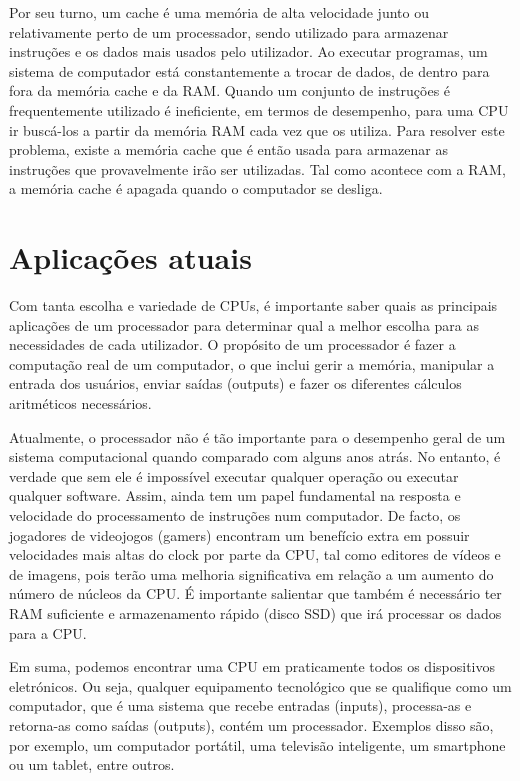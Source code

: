 \documentclass{report}
\begin{document}
Por seu turno, um cache é uma memória de alta velocidade junto ou relativamente perto de um processador, sendo utilizado para armazenar instruções e os dados mais usados pelo utilizador. Ao executar programas, um sistema de computador está constantemente a trocar de dados, de dentro para fora da memória cache e da \ac{RAM}. Quando um conjunto de instruções é frequentemente utilizado é ineficiente, em termos de desempenho, para uma \ac{CPU} ir buscá-los a partir da memória \ac{RAM} cada vez que os utiliza. Para resolver este problema, existe a memória cache que é então usada para armazenar as instruções que provavelmente irão ser utilizadas. Tal como acontece com a \ac{RAM}, a memória cache é apagada quando o computador se desliga\cite{Desempenho2}.


\section{Aplicações atuais}
Com tanta escolha e variedade de \ac{CPU}s, é importante saber quais as principais aplicações de um processador para determinar qual a melhor escolha para as necessidades de cada utilizador. O propósito de um processador é fazer a computação real de um computador, o que inclui gerir a memória, manipular a entrada dos usuários, enviar saídas (outputs) e fazer os diferentes cálculos aritméticos necessários\cite{Aplicações1/Velocidade1}.

Atualmente, o processador não é tão importante para o desempenho geral de um sistema computacional quando comparado com alguns anos atrás. No entanto, é verdade que sem ele é impossível executar qualquer operação ou executar qualquer software. Assim, ainda tem um papel fundamental na resposta e velocidade do processamento de instruções num computador. De facto, os jogadores de videojogos (gamers) encontram um benefício extra em possuir velocidades mais altas do clock por parte da \ac{CPU}, tal como editores de vídeos e de imagens, pois terão uma melhoria significativa em relação a um aumento do número de núcleos da \ac{CPU}. É importante salientar que também é necessário ter \ac{RAM} suficiente e armazenamento rápido (disco \ac{SSD}) que irá processar os dados para a \ac{CPU}\cite{Aplicações1/Velocidade1}.

Em suma, podemos encontrar uma \ac{CPU} em praticamente todos os dispositivos eletrónicos. Ou seja, qualquer equipamento tecnológico que se qualifique como um computador, que é uma sistema que recebe entradas (inputs), processa-as e retorna-as como saídas (outputs), contém um processador. Exemplos disso são, por exemplo, um computador portátil, uma televisão inteligente, um smartphone ou um tablet, entre outros\cite{Aplicações1/Velocidade1}.
\end{document}
